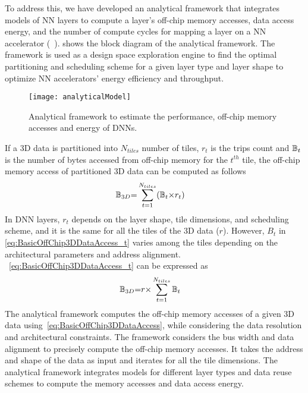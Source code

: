 To address this, we have developed an analytical framework that integrates models of NN layers to compute a layer's off-chip memory accesses, data access energy, and the number of compute cycles for mapping a layer on a NN accelerator (~).  shows the block diagram of the analytical framework. The framework is used as a design space exploration engine to find the optimal partitioning and scheduling scheme for a given layer type and layer shape to optimize NN accelerators' energy efficiency and throughput. 
\begin{figure}[!htb]
	\centering
    \captionsetup{font=sf}	
	\texttt{[image: analyticalModel]}
	\caption{Analytical framework to estimate the performance, off-chip memory accesses and energy of DNNs.}
	\label{fig:analyticalModel}
\end{figure}

If a 3D data is partitioned into $N_{tiles}$ number of tiles, $r_t$ is the trips count and $\mathbb{B}_{t}$ is the number of bytes accessed from off-chip memory for the $t^{th}$ tile, the off-chip memory access of partitioned 3D data can be computed as follows
\begin{align}\label{eq:BasicOffChip3DDataAccess_t}
	\mathbb{B}_{3D}&{=}\sum_{t=1}^{N_{tiles}}(\mathbb{B}_{t}{\times}r_t)
\end{align}
In DNN layers, $r_t$ depends on the layer shape, tile dimensions, and scheduling scheme, and it is the same for all the tiles of the 3D data ($r$). However, $B_t$ in \eqref{eq:BasicOffChip3DDataAccess_t} varies among the tiles depending on the architectural parameters and address alignment. ~\eqref{eq:BasicOffChip3DDataAccess_t} can be expressed as 
\begin{align}\label{eq:BasicOffChip3DDataAccess}
	\mathbb{B}_{3D}&{=}r{\times}\sum_{t=1}^{N_{tiles}}\mathbb{B}_{t}
\end{align}
The analytical framework computes the off-chip memory accesses of a given 3D data using~\eqref{eq:BasicOffChip3DDataAccess}, while considering the data resolution and architectural constraints. The framework considers the bus width and data alignment to precisely compute the off-chip memory accesses. It takes the address and shape of the data as input and iterates for all the tile dimensions. The analytical framework integrates models for different layer types and data reuse schemes to compute the memory accesses and data access energy. 

